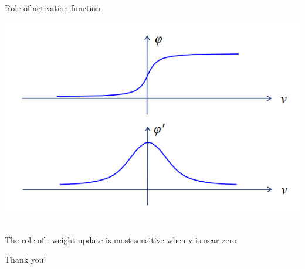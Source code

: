 \documentclass[notes]{beamer}
\newcommand{\chuhao}{\fontsize{44.9pt}{\baselineskip}\selectfont}
\begin{document}
\begin{frame}{Role of activation function}

\centering 

\includegraphics[width=1.00000\textwidth]{2018-03-10-10-41-52.png} ~

The role of : weight update is most sensitive when v is near zero

\end{frame}

\begin{frame}
	\chuhao Thank you! %
\end{frame}
\end{document}
